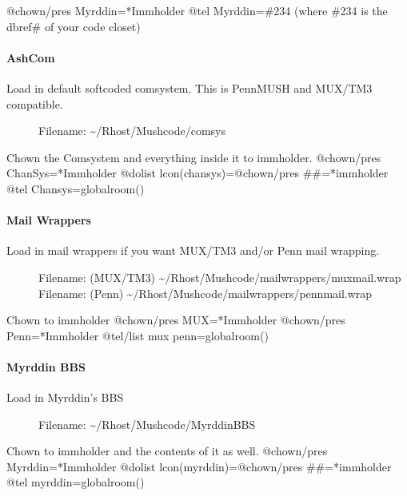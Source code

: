 \documentclass[letterpaper,10pt,english]{sphinxmanual}
\begin{document}
\sphinxAtStartPar
@chown/pres Myrddin=*Immholder
@tel Myrddin=\#234 (where \#234 is the dbref\# of your code closet)


\paragraph{AshCom}
\label{\detokenize{gettingstarted:ashcom}}\begin{description}
\item[{Load in default softcoded comsystem.  This is PennMUSH and MUX/TM3 compatible.}] \leavevmode
\sphinxAtStartPar
Filename: \textasciitilde{}/Rhost/Mushcode/comsys

\end{description}

\sphinxAtStartPar
Chown the Comsystem and everything inside it to immholder.
@chown/pres ChanSys=*Immholder
@dolist lcon(chansys)=@chown/pres \#\#=*immholder
@tel Chansys=globalroom()


\paragraph{Mail Wrappers}
\label{\detokenize{gettingstarted:mail-wrappers}}\begin{description}
\item[{Load in mail wrappers if you want MUX/TM3 and/or Penn mail wrapping.}] \leavevmode
\sphinxAtStartPar
Filename: (MUX/TM3) \textasciitilde{}/Rhost/Mushcode/mailwrappers/muxmail.wrap
Filename: (Penn)    \textasciitilde{}/Rhost/Mushcode/mailwrappers/pennmail.wrap

\end{description}

\sphinxAtStartPar
Chown to immholder
@chown/pres MUX=*Immholder
@chown/pres Penn=*Immholder
@tel/list mux penn=globalroom()


\paragraph{Myrddin BBS}
\label{\detokenize{gettingstarted:myrddin-bbs}}\begin{description}
\item[{Load in Myrddin’s BBS}] \leavevmode
\sphinxAtStartPar
Filename: \textasciitilde{}/Rhost/Mushcode/MyrddinBBS

\end{description}

\sphinxAtStartPar
Chown to immholder and the contents of it as well.
@chown/pres Myrddin=*Immholder
@dolist lcon(myrddin)=@chown/pres \#\#=*immholder
@tel myrddin=globalroom()
\end{document}
